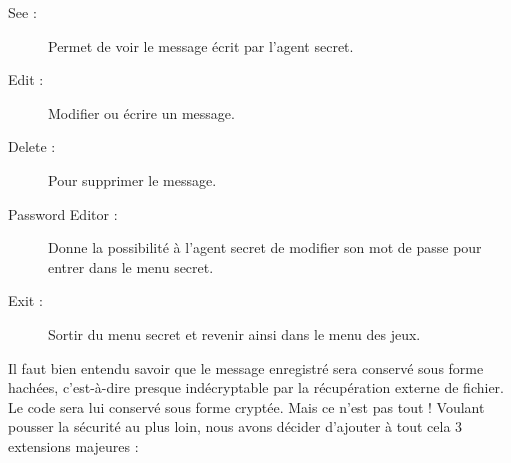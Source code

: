 \begin{description}
    \item [See :] Permet de voir le message écrit par l'agent secret.
    \item [Edit :] Modifier ou écrire un message.
    \item [Delete :] Pour supprimer le message.
    \item [Password Editor :] Donne la possibilité à l'agent secret de modifier son mot de passe pour entrer dans le menu secret.
    \item [Exit :] Sortir du menu secret et revenir ainsi dans le menu des jeux.
\end{description}
Il faut bien entendu savoir que le message enregistré sera conservé sous forme hachées, c'est-à-dire presque indécryptable par la récupération externe de fichier.
Le code sera lui conservé sous forme cryptée.
\newline
\newline
Mais ce n'est pas tout ! Voulant pousser la sécurité au plus loin, nous avons décider d'ajouter à tout cela 3 extensions majeures : 
